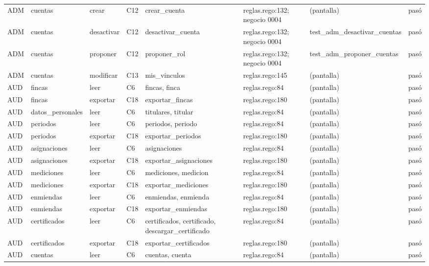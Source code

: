\documentclass[11pt,letterpaper]{article}
\begin{document}
\begin{center}
\begin{longtable}{@{}p{0.6cm} p{1.7cm} p{1.2cm} p{0.9cm} p{3.4cm} p{2.6cm} p{3.4cm} p{0.8cm}@{}}
ADM & cuentas & crear & C12 & crear\_cuenta & reglas.rego:132; negocio 0004 & (pantalla) & pasó \\
ADM & cuentas & desactivar & C12 & desactivar\_cuenta & reglas.rego:132; negocio 0004 & test\_\allowbreak{}adm\_\allowbreak{}desactivar\_\allowbreak{}cuentas & pasó \\
ADM & cuentas & proponer & C12 & proponer\_rol & reglas.rego:132; negocio 0004 & test\_\allowbreak{}adm\_\allowbreak{}proponer\_\allowbreak{}cuentas & pasó \\
ADM & cuentas & modificar & C13 & mis\_vinculos & reglas.rego:145 & (pantalla) & pasó \\
AUD & fincas & leer & C6 & fincas, \allowbreak{}finca & reglas.rego:84 & (pantalla) & pasó \\
AUD & fincas & exportar & C18 & exportar\_fincas & reglas.rego:180 & (pantalla) & pasó \\
AUD & datos\_\allowbreak{}personales & leer & C6 & titulares, \allowbreak{}titular & reglas.rego:84 & (pantalla) & pasó \\
AUD & periodos & leer & C6 & periodos, \allowbreak{}periodo & reglas.rego:84 & (pantalla) & pasó \\
AUD & periodos & exportar & C18 & exportar\_periodos & reglas.rego:180 & (pantalla) & pasó \\
AUD & asignaciones & leer & C6 & asignaciones & reglas.rego:84 & (pantalla) & pasó \\
AUD & asignaciones & exportar & C18 & exportar\_asignaciones & reglas.rego:180 & (pantalla) & pasó \\
AUD & mediciones & leer & C6 & mediciones, \allowbreak{}medicion & reglas.rego:84 & (pantalla) & pasó \\
AUD & mediciones & exportar & C18 & exportar\_mediciones & reglas.rego:180 & (pantalla) & pasó \\
AUD & enmiendas & leer & C6 & enmiendas, \allowbreak{}enmienda & reglas.rego:84 & (pantalla) & pasó \\
AUD & enmiendas & exportar & C18 & exportar\_enmiendas & reglas.rego:180 & (pantalla) & pasó \\
AUD & certificados & leer & C6 & certificados, \allowbreak{}certificado, \allowbreak{}descargar\_certificado & reglas.rego:84 & (pantalla) & pasó \\
AUD & certificados & exportar & C18 & exportar\_certificados & reglas.rego:180 & (pantalla) & pasó \\
AUD & cuentas & leer & C6 & cuentas, \allowbreak{}cuenta & reglas.rego:84 & (pantalla) & pasó \\

\end{longtable}
\end{center}
\end{document}
